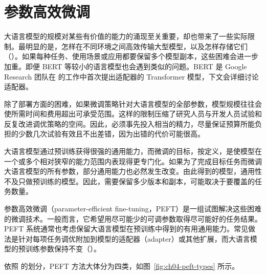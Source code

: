 \section{参数高效微调}
\label{sec:ch04-peft}
大语言模型的规模对某些有价值的能力的涌现至关重要，却也带来了一些实际限制。最明显的是，怎样在不同环境之间高效传输大型模型，以及怎样存储它们（）。如果每种任务、使用场景或应用都要保留多个模型副本，这些困难会进一步加重。即便 BERT 等较小的语言模型也会遇到类似的问题。BERT 是 Google Research 团队在 的工作中首次提出适配器的 Transformer 模型，下文会详细讨论适配器。

除了部署方面的困难，如果微调策略针对大语言模型的全部参数，模型规模往往会使所需时间和费用超出可承受范围。这样的限制压缩了研究人员与开发人员试验和反复改进调优策略的空间。因此，必须事先投入相当的精力，尽量保证预算所能负担的少数几次试验有效且不出差错，因为出错的代价可能很高。

大语言模型通过预训练获得很强的通用能力，而微调的目标，按定义，是使模型在一个或多个相对狭窄的能力范围内表现得更专门化。如果为了完成目标任务而微调大语言模型的所有参数，部分通用能力也必然发生改变。由此得到的模型，通用性不及只做预训练的模型。因此，需要保留多少版本和副本，可能取决于要覆盖的任务数量。

参数高效微调（parameter-efficient fine-tuning，PEFT）是一组试图解决这些困难的微调技术。一般而言，它希望用尽可能少的可调参数取得尽可能好的任务结果。PEFT 系统通常也考虑保留大语言模型在预训练中得到的有用通用能力。常见做法是针对每项任务调优附加到模型的适配器（adapter）或其他扩展，而大语言模型的预训练参数保持不变（）。


依照 的划分，PEFT 方法大体分为四类，如图~\ref{fig:ch04-peft-types} 所示。

